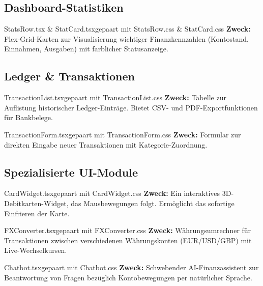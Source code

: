 \documentclass[11pt,a4paper]{article}
\begin{document}
\subsection{Dashboard-Statistiken}
\begin{FeatureCard}{StatsRow.tsx \& StatCard.tsx}{gepaart mit StatsRow.css \& StatCard.css}
\textbf{Zweck:} Flex-Grid-Karten zur Visualisierung wichtiger Finanzkennzahlen (Kontostand, Einnahmen, Ausgaben) mit farblicher Statusanzeige.
\end{FeatureCard}

\subsection{Ledger \& Transaktionen}
\begin{FeatureCard}{TransactionList.tsx}{gepaart mit TransactionList.css}
\textbf{Zweck:} Tabelle zur Auflistung historischer Ledger-Einträge. Bietet CSV- und PDF-Exportfunktionen für Bankbelege.
\end{FeatureCard}

\begin{FeatureCard}{TransactionForm.tsx}{gepaart mit TransactionForm.css}
\textbf{Zweck:} Formular zur direkten Eingabe neuer Transaktionen mit Kategorie-Zuordnung.
\end{FeatureCard}

\subsection{Spezialisierte UI-Module}
\begin{FeatureCard}{CardWidget.tsx}{gepaart mit CardWidget.css}
\textbf{Zweck:} Ein interaktives 3D-Debitkarten-Widget, das Mausbewegungen folgt. Ermöglicht das sofortige Einfrieren der Karte.
\end{FeatureCard}

\begin{FeatureCard}{FXConverter.tsx}{gepaart mit FXConverter.css}
\textbf{Zweck:} Währungsumrechner für Transaktionen zwischen verschiedenen Währungskonten (EUR/USD/GBP) mit Live-Wechselkursen.
\end{FeatureCard}

\begin{FeatureCard}{Chatbot.tsx}{gepaart mit Chatbot.css}
\textbf{Zweck:} Schwebender AI-Finanzassistent zur Beantwortung von Fragen bezüglich Kontobewegungen per natürlicher Sprache.
\end{FeatureCard}

\newpage
\end{document}
